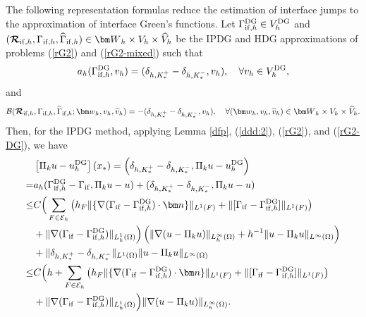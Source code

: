 \documentclass[1996/10/24]{amsart}
\theoremstyle{definition}
\numberwithin{equation}{section}
\begin{document}
The following representation formulas reduce the estimation of interface jumps to the approximation of
interface Green's functions.
Let $\Gamma_{{\rm if},h}^{{\rm DG}}\in V_h^{{\rm DG}}$ and $(\boldsymbol{\mathcal{R}}_{{\rm if},h},\Gamma_{{\rm if},h},\widehat{\Gamma}_{{\rm if},h})\in {\bm W}_h\times V_h\times \widehat{V}_h$ be the IPDG and HDG approximations of problems (\ref{rG2}) and (\ref{rG2-mixed}) such that
\begin{align}
a_h(\Gamma_{{\rm if},h}^{{\rm DG}},v_h)=(\delta_{h,K_{\ast}^+}-\delta_{h,K_{\ast}^-},v_h),\quad \forall v_h\in V_h^{{\rm DG}},\label{rG2-DG}
\end{align}
and
\begin{align}
\mathcal{B}(\boldsymbol{\mathcal{R}}_{{\rm if},h},\Gamma_{{\rm if},h},\widehat{\Gamma}_{{\rm if},h};{\bm w}_h,v_h,\widehat{v}_h)=-(\delta_{h,K_{\ast}^+}-\delta_{h,K_{\ast}^-},v_h),\quad \forall ({\bm w}_h,v_h,\widehat{v}_h)\in{\bm W}_h\times V_h\times \widehat{V}_h.\label{rG2-HDG}
\end{align}
Then, for the IPDG method, applying Lemma \ref{dfp}, (\ref{ddd:2}), (\ref{rG2}), and (\ref{rG2-DG}), we have
\begin{align}
&\left[\Pi_ku-u_h^{{\rm DG}}\right](x_{\ast})=\left(\delta_{h,K_{\ast}^+}-\delta_{h,K_{\ast}^-},\Pi_ku-u_{h}^{{\rm DG}}\right)\nonumber\\
=&a_h(\Gamma_{{\rm if},h}^{{\rm DG}}-\Gamma_{{\rm if}},\Pi_ku-u)+(\delta_{h,K_{\ast}^+}-\delta_{h,K_{\ast}^-},\Pi_ku-u)\nonumber\\
\leq&C\Big(\sum_{F\in\mathcal{E}_h}\left(h_F\|\{\nabla(\Gamma_{{\rm if}}-\Gamma_{{\rm if},h}^{{\rm DG}})\cdot{\bm n}\}\|_{L^1(F)}+\|[\Gamma_{{\rm if}}-\Gamma_{{\rm if},h}^{{\rm DG}}]\|_{L^1(F)}\right)\nonumber\\
&+\|\nabla(\Gamma_{{\rm if}}-\Gamma_{{\rm if},h}^{{\rm DG}})\|_{L_h^1(\Omega)}\Big)\left(\|\nabla(u-\Pi_ku)\|_{L_h^{\infty}(\Omega)}+h^{-1}\|u-\Pi_ku\|_{L^{\infty}(\Omega)}\right)\label{rG2:1}\\
&+\|\delta_{h,K_{\ast}^+}-\delta_{h,K_{\ast}^-}\|_{L^1(\Omega)}\|u-\Pi_ku\|_{L^{\infty}(\Omega)}\nonumber\\
\leq& C\Big(h+\sum_{F\in\mathcal{E}_h}\left(h_F\|\{\nabla(\Gamma_{{\rm if}}-\Gamma_{{\rm if},h}^{{\rm DG}})\cdot{\bm n}\}\|_{L^1(F)}+\|[\Gamma_{{\rm if}}-\Gamma_{{\rm if},h}^{{\rm DG}}]\|_{L^1(F)}\right)\nonumber\\
&+\|\nabla(\Gamma_{{\rm if}}-\Gamma_{{\rm if},h}^{{\rm DG}})\|_{L_h^1(\Omega)}\Big)\|\nabla(u-\Pi_ku)\|_{L_h^{\infty}(\Omega)}.\nonumber
\end{align}
\end{document}
